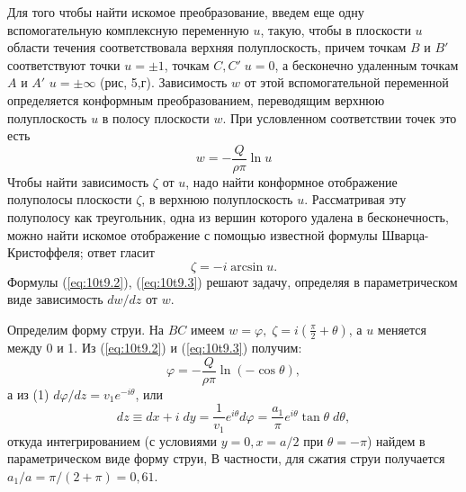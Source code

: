 Для того чтобы найти искомое преобразование, введем еще одну вспомогательную
комплексную переменную $u$, такую, чтобы в плоскости $u$ области течения
соответствовала верхняя полуплоскость, причем точкам $B$ и $B'$ соответствуют
точки $u=\pm 1$, точкам $C,C'\; u = 0$, а бесконечно удаленным точкам $A$ и $A'$
$u = \pm \infty$ (рис, 5,г). Зависимость $w$ от этой вспомогательной переменной
определяется конформным преобразованием, переводящим верхнюю полуплоскость $u$ в
полосу плоскости $w$. При условленном соответствии точек это есть
\begin{equation}
   \label{eq:10t9.2}
   w = - \frac{Q}{\rho\pi}\ln u
\end{equation}
Чтобы найти зависимость $\zeta$ от $u$, надо найти конформное отображение
полуполосы плоскости $\zeta$, в верхнюю полуплоскость $u$. Рассматривая эту
полуполосу как треугольник, одна из вершин которого удалена в бесконечность,
можно найти искомое отображение с помощью известной формулы Шварца-Кристоффеля;
ответ гласит
\begin{equation}
   \label{eq:10t9.3}
   \zeta = - i \arcsin u.
\end{equation}
Формулы (\ref{eq:10t9.2}), (\ref{eq:10t9.3}) решают задачу, определяя в параметрическом виде зависимость
$dw/dz$ от $w$.

Определим форму струи. На $BC$ имеем
$w = \varphi,\; \zeta = i \left( \frac{\pi}{2}+\theta \right) $, а $u$
меняется между 0 и 1. Из (\ref{eq:10t9.2}) и (\ref{eq:10t9.3}) получим:
\begin{equation}
   \label{eq:10t9.4}
   \varphi = - \frac{Q}{\rho \pi}\ln (-\cos \theta),
\end{equation}
а из (1) $d\varphi/dz = v_1 e^{-i\theta}$, или
\[
   dz \equiv dx + i\; dy = \frac1{v_1} e^{i\theta}d\varphi =
   \frac{a_1}{\pi} e^{i\theta} \tan \theta\; d\theta,
\]
откуда интегрированием (с условиями $y=0, x=a/2$ при $\theta = - \pi$) найдем
в параметрическом виде форму струи, В частности, для сжатия струи получается
$a_1/a = \pi/(2+\pi) = 0,61$.


